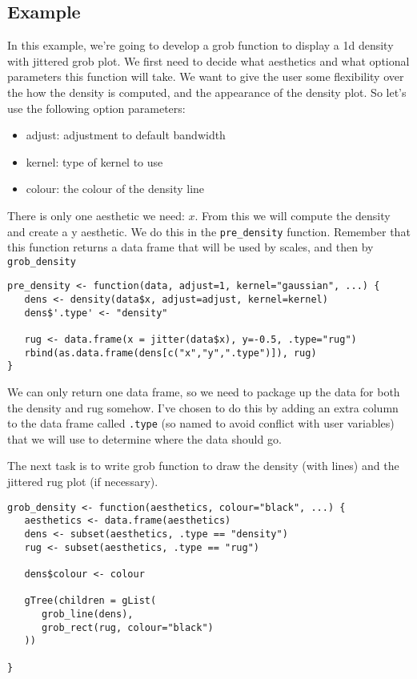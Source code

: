 \subsection{Example}\label{sub:example}

In this example, we're going to develop a grob function to display a 1d density with jittered grob plot.  We first need to decide what aesthetics and what optional parameters this function will take.  We want to give the user some flexibility over the how the density is computed, and the appearance of the density plot.  So let's use the following option parameters:

\begin{itemize}
	\item adjust: adjustment to default bandwidth
	\item kernel: type of kernel to use
	\item colour: the colour of the density line
\end{itemize}

There is only one aesthetic we need: $x$.  From this we will compute the density and create a y aesthetic.  We do this in the \texttt{pre\_density} function.  Remember that this function returns a data frame that will be used by scales, and then by \texttt{grob\_density}

\begin{verbatim}
pre_density <- function(data, adjust=1, kernel="gaussian", ...) {
   dens <- density(data$x, adjust=adjust, kernel=kernel)
   dens$'.type' <- "density"

   rug <- data.frame(x = jitter(data$x), y=-0.5, .type="rug")
   rbind(as.data.frame(dens[c("x","y",".type")]), rug)
}
\end{verbatim}

We can only return one data frame, so we need to package up the data for both the density and rug somehow.  I've chosen to do this by adding an extra column to the data frame called \texttt{.type} (so named to avoid conflict with user variables) that we will use to determine where the data should go.

The next task is to write grob function to draw the density (with lines) and the jittered rug plot (if necessary).

\begin{verbatim}
grob_density <- function(aesthetics, colour="black", ...) {
   aesthetics <- data.frame(aesthetics)
   dens <- subset(aesthetics, .type == "density")
   rug <- subset(aesthetics, .type == "rug")

   dens$colour <- colour

   gTree(children = gList(
      grob_line(dens),
      grob_rect(rug, colour="black")
   ))

}
\end{verbatim}

